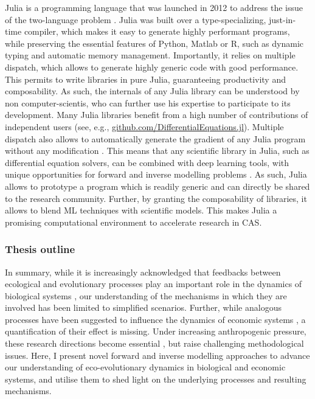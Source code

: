 Julia is a programming language that was launched in 2012 to address the issue of the two-language problem \cite{Bezanson2017,Bezanson2018}. Julia was built over a type-specializing, just-in-time compiler, which makes it easy to generate highly performant programs, while preserving the essential features of Python, Matlab or R, such as dynamic typing and automatic memory management.
% 
Importantly, it relies on multiple dispatch, which allows to generate highly generic code with good performance. This permits to write libraries in pure Julia, guaranteeing productivity and composability.
% 
% 
As such, the internals of any Julia library can be understood by non computer-scientis, who can further use his expertise to participate to its development. Many Julia libraries benefit from a high number of contributions of independent users (see, e.g., \href{github.com/DifferentialEquations.jl}{github.com/DifferentialEquations.jl}).
% 
Multiple dispatch also allows to automatically generate the gradient of any Julia program without any modification \cite{ForwardDiff.jl, Zygote.jl}. This means that any scientific library in Julia, such as differential equation solvers, can be combined with deep learning tools, with unique opportunities for forward and inverse modelling problems \cite{Frank2022}. 
% 
% 
As such, Julia allows to prototype a program which is readily generic and can directly be shared to the research community. Further, by granting the composability of libraries, it allows to blend ML techniques with scientific models. This makes Julia a promising computational environment to accelerate research in CAS. 

\subsubsection*{Thesis outline}

In summary, while it is increasingly acknowledged that feedbacks between ecological and evolutionary processes play an important role in the dynamics of biological systems \cite{Pelletier2009, Urban2016}, our understanding of the mechanisms in which they are involved has been limited to simplified scenarios.
% 
Further, while analogous processes have been suggested to influence the dynamics of economic systems \cite{Hodgson2019}, a quantification of their effect is missing.
%
Under increasing anthropogenic pressure, these research directions become essential \cite{Urban2016}, but raise challenging methodological issues.
% 
Here, I present novel forward and inverse modelling approaches to advance our understanding of eco-evolutionary dynamics in biological and economic systems, and utilise them to shed light on the underlying processes and resulting mechanisms.


